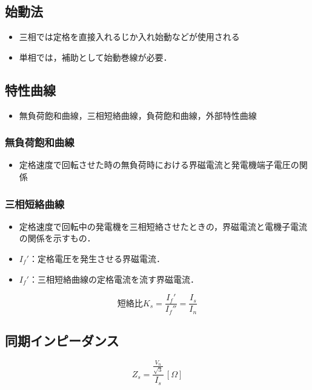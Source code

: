 \subsection{始動法}
\begin{itemize}
  \item 三相では定格を直接入れるじか入れ始動などが使用される
  \item 単相では，補助として始動巻線が必要．
\end{itemize}

\subsection{特性曲線}
\begin{itemize}
  \item 無負荷飽和曲線，三相短絡曲線，負荷飽和曲線，外部特性曲線
\end{itemize}

\subsubsection{無負荷飽和曲線}
\begin{itemize}
  \item 定格速度で回転させた時の無負荷時における界磁電流と発電機端子電圧の関係
\end{itemize}

\subsubsection{三相短絡曲線}
\begin{itemize}
  \item 定格速度で回転中の発電機を三相短絡させたときの，界磁電流と電機子電流の関係を示すもの．
\end{itemize}


\begin{itemize}
  \item $I_f'$：定格電圧を発生させる界磁電流．
  \item $I_f'$：三相短絡曲線の定格電流を流す界磁電流．
\end{itemize}
\begin{equation}
  \mbox{短絡比} K_s = \frac{I_f'}{I_f''} = \frac{I_s}{I_n}
\end{equation}

\subsection{同期インピーダンス}
\begin{equation}
  Z_s = \frac{\frac{V_n}{\sqrt{3}}}{I_s}\, [\Omega]
\end{equation}

